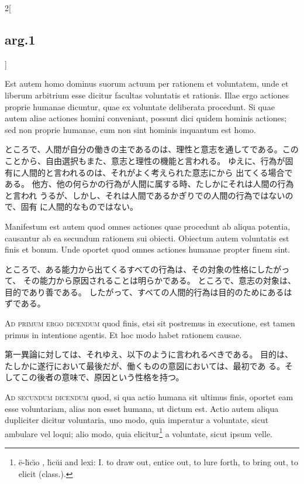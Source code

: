 \documentclass[paper=a4paper,fontsize=10pt,jafontsize=9pt,titlepage]{jlreq}
\begin{document}
\begin{paracol}{2}[\subsection{arg.1}]
\switchcolumn*

Est autem
homo dominus suorum actuum per rationem et voluntatem, unde et liberum
arbitrium esse dicitur facultas voluntatis et rationis. Illae ergo
actiones proprie humanae dicuntur, quae ex voluntate deliberata
procedunt. Si quae autem aliae actiones homini conveniant, possunt dici
quidem hominis actiones; sed non proprie humanae, cum non sint hominis
inquantum est homo.

\switchcolumn

ところで、人間が自分の働きの主であるのは、理性と意志を通してである。この
 ことから、自由選択もまた、意志と理性の機能と言われる。
ゆえに、行為が固有に人間的と言われるのは、それがよく考えられた意志にから
 出てくる場合である。
他方、他の何らかの行為が人間に属する時、たしかにそれは人間の行為と言われ
 うるが、しかし、それは人間であるかぎりでの人間の行為ではないので、固有
 に人間的なものではない。

\switchcolumn*

Manifestum est autem quod omnes actiones quae
procedunt ab aliqua potentia, causantur ab ea secundum rationem sui
obiecti. Obiectum autem voluntatis est finis et bonum. Unde oportet quod
omnes actiones humanae propter finem sint.

\switchcolumn

ところで、ある能力から出てくるすべての行為は、その対象の性格にしたがって、
 その能力から原因されることは明らかである。
ところで、意志の対象は、目的であり善である。
したがって、すべての人間的行為は目的のためにあるはずである。

\switchcolumn*[\subsection{ad.1}]

{\scshape Ad primum ergo dicendum} quod finis, etsi
sit postremus in executione, est tamen primus in intentione agentis. Et
hoc modo habet rationem causae.

\switchcolumn

第一異論に対しては、それゆえ、以下のように言われるべきである。
目的は、たしかに遂行において最後だが、働くものの意図においては、最初であ
 る。そしてこの後者の意味で、原因という性格を持つ。

\switchcolumn*[\subsection{ad.2}]

{\scshape Ad secundum dicendum} quod, si qua actio
humana sit ultimus finis, oportet eam esse voluntariam, alias non esset
humana, ut dictum est. Actio autem aliqua dupliciter dicitur voluntaria,
uno modo, quia imperatur a voluntate, sicut ambulare vel loqui; alio
modo, quia elicitur\footnote{\={e}-l\u{\i}c\u{\i}o , l\u{\i}c\u{u}i and lexi:
I. to draw out, entice out, to lure forth, to bring out, to elicit (class.). } a voluntate, sicut ipsum velle.


\end{paracol}
\end{document}
